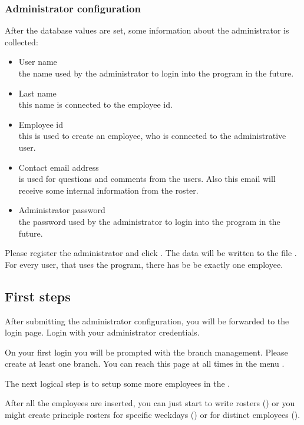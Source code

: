 \subsubsection{Administrator configuration}
After the database values are set, some information about the administrator is collected:
\begin{itemize}
\item User name\\ the name used by the administrator to login into the program in the future. 
\item Last name\\ this name is connected to the employee id.
\item Employee id\\ this is used to create an employee, who is connected to the administrative user.
\item Contact email address\\ is used for questions and comments from the users. Also this email will receive some internal information from the roster.
\item Administrator password\\ the password used by the administrator to login into the program in the future. 
\end{itemize}
Please register the administrator and click .
The data will be written to the file .
For every user, that uses the program, there has be be exactly one employee. 
\subsection{First steps}
After submitting the administrator configuration, you will be forwarded to the login page.
Login with your administrator credentials.

On your first login you will be prompted with the branch management. 
Please create at least one branch. You can reach this page at all times in the menu .

The next logical step is to setup some more employees in the .

After all the employees are inserted, you can just start to write rosters () or you might create principle rosters for specific weekdays () or for distinct employees ().

